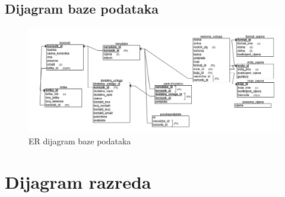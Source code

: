 			\subsection{Dijagram baze podataka}
			
			\begin{figure}[H]
				\includegraphics[scale=0.5]{dijagrami/dijagram_baze_podataka.PNG} 
				\centering
				\caption{ER dijagram baze podataka}
				\label{fig:dij_bp1}%
			\end{figure}
			
		
		\newpage	
		\section{Dijagram razreda}
		
			
			
			
			

